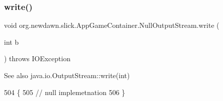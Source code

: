 \subsubsection{\texorpdfstring{write()}{write()}}
{\footnotesize\ttfamily void org.\+newdawn.\+slick.\+App\+Game\+Container.\+Null\+Output\+Stream.\+write (\begin{DoxyParamCaption}\item[{int}]{b }\end{DoxyParamCaption}) throws I\+O\+Exception\hspace{0.3cm}{\ttfamily [inline]}}

\begin{DoxySeeAlso}{See also}
java.\+io.\+Output\+Stream\+::write(int) 
\end{DoxySeeAlso}

\begin{DoxyCode}
504                                                     \{
505             \textcolor{comment}{// null implemetnation}
506         \}
\end{DoxyCode}
